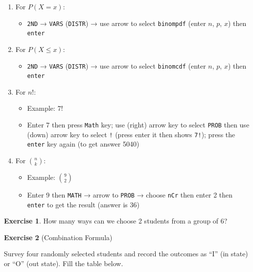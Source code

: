 \documentclass[
]{book}
\providecommand{\tightlist}{%
  \setlength{\itemsep}{0pt}\setlength{\parskip}{0pt}}
\begin{document}
\begin{enumerate}
\def\labelenumi{\arabic{enumi}.}
\tightlist
\item
  For \(P(X = x)\):

  \begin{itemize}
  \tightlist
  \item
    \texttt{2ND} → \texttt{VARS} (\texttt{DISTR}) → use arrow to select \texttt{binompdf} (enter \(n\), \(p\), \(x\)) then \texttt{enter}
  \end{itemize}
\item
  For \(P(X \leq x)\):

  \begin{itemize}
  \tightlist
  \item
    \texttt{2ND} → \texttt{VARS} (\texttt{DISTR}) → use arrow to select \texttt{binomcdf} (enter \(n\), \(p\), \(x\)) then \texttt{enter}
  \end{itemize}
\item
  For \(n!\):

  \begin{itemize}
  \tightlist
  \item
    Example: \(7!\)
  \item
    Enter 7 then press \texttt{Math} key; use (right) arrow key to select \texttt{PROB} then use (down) arrow key to select \texttt{!} (press enter it then shows \texttt{7!}); press the \texttt{enter} key again (to get answer 5040)
  \end{itemize}
\item
  For \(\binom{n}{k}\):

  \begin{itemize}
  \tightlist
  \item
    Example: \(\binom{9}{2}\)
  \item
    Enter 9 then \texttt{MATH} → arrow to \texttt{PROB} → choose \texttt{nCr} then enter 2 then \texttt{enter} to get the result (answer is 36)
  \end{itemize}
\end{enumerate}

\textbf{Exercise 1}. How many ways can we choose 2 students from a group of 6?

\textbf{Exercise 2} (Combination Formula)

Survey four randomly selected students and record the outcomes as ``I'' (in state) or ``O'' (out state). Fill the table below.
\end{document}
